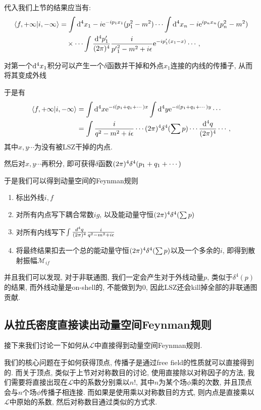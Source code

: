 代入我们上节的结果应当有:
\begin{align}
    \braket{f, +\infty|i, -\infty}&=\int\mathrm d^4x_1 -i\mathrm e^{-ip_1x_1}(p_1^2-m^2)\cdots\int\mathrm d^4x_n -i\mathrm e^{ip_nx_n}(p_n^2-m^2)\notag\\
    &\quad\times\cdots\int\frac{\mathrm d^4p_1'}{(2\pi)^{4}}\frac{i}{{p'}_1^2-m^2+i\epsilon}\mathrm e^{-ip_1'(x_1-x)}\cdots,
\end{align}

对第一个$\mathrm d^4x_1$积分可以产生一个$\delta$函数并干掉和外点$x_1$连接的内线的传播子, 从而将其变成外线

于是有
\begin{align}
    \braket{f, +\infty|i, -\infty}&=\int \mathrm d^4x\mathrm e^{-i(p_1+q_1+\cdots)x}\int\mathrm d^4y\mathrm e^{-i(p_1+q_1+\cdots)y}\cdots\\
    &=\int\frac i{q^2-m^2+i\epsilon}\cdots(2\pi)^{4}\delta^4(\sum p)\cdots\frac{\mathrm d^4 q}{(2\pi)^{4}}\cdots,
\end{align}
其中$x, y\cdots$为没有被LSZ干掉的内点.

然后对$x, y\cdots$再积分, 即可获得$\delta$函数$(2\pi)^{4}\delta^4(p_1+q_1+\cdots)$

于是我们可以得到动量空间的Feynman规则\cite{griffthsPPFeynman}
\begin{important}
    \begin{enumerate}
        \item 标出外线$i, f$
        \item 对所有内点写下耦合常数$ig$, 以及能动量守恒$(2\pi)^{4}\delta^4(\sum p)$
        \item 对所有内线写下$\int\frac{d^4q}{(2\pi)^{4}}\frac i{q^2-m^2+i\epsilon}$
        \item 将最终结果扣去一个总的能动量守恒$(2\pi)^{4}\delta^4(\sum p)$以及一个多余的$i$, 即得到散射振幅$\mathcal M_{if}$
    \end{enumerate}
\end{important}

并且我们可以发现, 对于非联通图, 我们一定会产生对于外线动量$p$, 类似于$\delta^4(p)$的结果, 而外线动量是on-shell的, 不能做到为$0$, 因此LSZ还会kill掉全部的非联通图贡献.

\subsection{从拉氏密度直接读出动量空间Feynman规则}
接下来我们讨论一下如何从$\mathcal L$中直接得到动量空间Feynman规则.

我们的核心问题在于如何获得顶点, 传播子是通过free field的性质就可以直接得到的. 而关于顶点, 类似于上节对对称数目的讨论, 使用直接除以对称因子的方法, 我们需要将直接出现在$\mathcal L$中的系数分别乘以$n!$, 其中$n$为某个场$\phi$乘的次数, 并且顶点会与$n$个场$\phi$传播子相连接. 而如果是使用乘以对称数目的方式, 则内点是直接乘以$\mathcal L$中原始的系数, 然后对称数目通过类似的方式求. 

